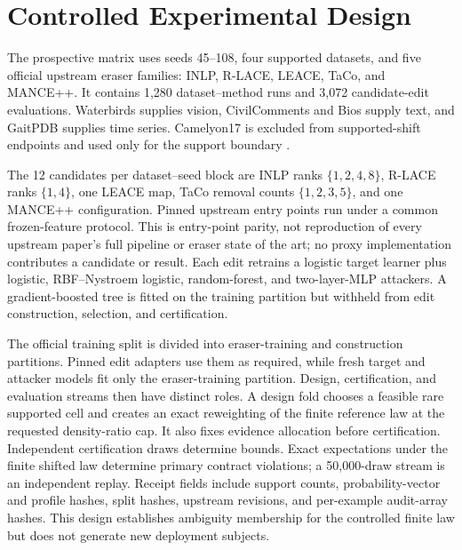 \section{Controlled Experimental Design}
\label{neurips:sec:protocol}

The prospective matrix uses seeds 45--108, four supported datasets, and five
official upstream eraser families: INLP, R-LACE, LEACE, TaCo, and MANCE++.
It contains 1,280 dataset--method runs and 3,072 candidate-edit evaluations.
Waterbirds supplies vision, CivilComments and Bios supply text, and GaitPDB
supplies time series. Camelyon17 is excluded from supported-shift endpoints and
used only for the support boundary
\cite{koh2021wilds,sagawa2020groupdro,borkan2019civilcomments,dearteaga2019bios}.

The 12 candidates per dataset--seed block are INLP ranks
$\{1,2,4,8\}$, R-LACE ranks $\{1,4\}$, one LEACE map, TaCo removal counts
$\{1,2,3,5\}$, and one MANCE++ configuration. Pinned upstream entry points run
under a common frozen-feature protocol. This is entry-point parity, not
reproduction of every upstream paper's full pipeline or eraser state of the
art; no proxy implementation contributes a candidate or result. Each edit
retrains a logistic target learner plus logistic, RBF--Nystroem
logistic, random-forest, and two-layer-MLP
attackers. A gradient-boosted tree is fitted on the training partition but
withheld from edit construction, selection, and certification.

The official training split is divided into eraser-training and construction
partitions. Pinned edit adapters use them as required, while fresh target and
attacker models fit only the eraser-training partition. Design, certification,
and evaluation streams then have distinct roles. A design fold chooses a feasible rare supported cell and creates an exact
reweighting of the finite reference law at the requested density-ratio cap. It
also fixes evidence allocation before certification. Independent certification
draws determine bounds. Exact expectations under the finite shifted law determine primary
contract violations; a 50,000-draw stream is an independent replay. Receipt
fields include support counts, probability-vector and profile hashes, split
hashes, upstream revisions, and per-example audit-array hashes. This design
establishes ambiguity membership for the controlled finite law but does not
generate new deployment subjects.

